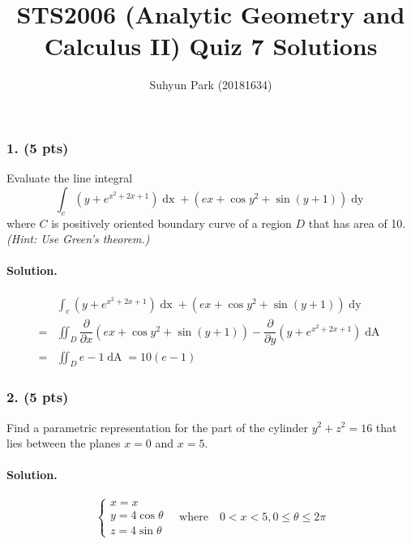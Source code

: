 \documentclass[runningheads]{llncs}
\begin{document}
\title{STS2006 (Analytic Geometry and Calculus II) \newline Quiz 7 Solutions}
\author{Suhyun Park (20181634)}
\maketitle

\subsubsection{1. (5 pts)} Evaluate the line integral \[\int_c \left(y+e^{x^2+2x+1}\right)\mathop{dx}+\left(ex+\cos y^2+\sin\left(y+1\right)\right)\mathop{dy}\] where $C$ is positively oriented boundary curve of a region $D$ that has area of 10. \textit{(Hint: Use Green's theorem.)}

\paragraph{Solution.}
\begin{align*}
	& \int_c \left(y+e^{x^2+2x+1}\right)\mathop{dx}+\left(ex+\cos y^2+\sin\left(y+1\right)\right)\mathop{dy}\\
	=& \iint_D \dfrac{\partial}{\partial x}\left(ex+\cos y^2+\sin\left(y+1\right)\right) 
		- \dfrac{\partial}{\partial y}\left(y+e^{x^2+2x+1}\right)\mathop{dA}\\
	=& \iint_D e-1\mathop{dA} = 10\left(e-1\right)
\end{align*}
\par

\subsubsection{2. (5 pts)} Find a parametric representation for the part of the cylinder $y^2+z^2=16$ that lies between the planes $x=0$ and $x=5$.

\paragraph{Solution.} \[
	\begin{cases}
		x=x \\
		y=4\cos\theta \\
		z=4\sin\theta
	\end{cases}\quad\text{where}\quad 0<x<5, 0\leq\theta\leq2\pi
\]
\end{document}
